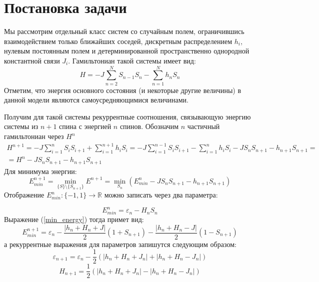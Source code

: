 
\section{Постановка задачи}
	Мы рассмотрим отдельный класс систем со случайным полем, ограничившись взаимодействием только ближайших соседей, дискретным распределением $h_i$, нулевым постоянным полем и детерминированной пространственно однородной константной связи $J_i$. Гамильтониан такой системы имеет вид:
	\begin{equation}
		H = - J \sum_{n=2}^{N} S_{n-1} S_n - \sum_{n=1}^N h_n S_n
	\end{equation}
	Отметим, что энергия основного состояния (и некоторые другие величины) в данной модели являются самоусредняющимися величинами.
	\newtheorem{ut}{Утверждение}
	\newtheorem*{zam}{Замечание}
	Получим для такой системы рекуррентные соотношения, связывающую энергию системы из $n+1$ спина с энергией $n$ спинов.  Обозначим $n$ частичный гамильтониан через $H^n$
	\begin{multline}
		H^{n+1} = - J\sum_{i=1} ^{n}  S_i S_{i+1} + \sum_{i=1}^{n+1} h_i S_i  = 
		-J \sum_{i=1}^{n-1} S_{i} S_{i+1} - \sum_{i=1}^{n} h_i S_i - J S_n S_{n+1} - h_{n+1} S_{n+1} = \\=
		H^n - J S_n S_{n+1} - h_{n+1} S_{n+1} 
	\end{multline}
	Для минимума энергии:
	\begin{equation}
	\label{min_energy}
	E_{min}^{n+1} = \min_{\{S\}\setminus \{S_{n+1}\}} E^{n+1} = \min_{S_n}(E_{min}^{n} - J S_n S_{n+1} - h_{n+1} S_{n+1})
	\end{equation}
	Отображение $E_{min}^n : \{-1, 1\}  \to \mathbb{R}$ можно записать через два параметра:
	
	\begin{equation}
	E^n_{min} = \varepsilon_n - H_n S_n
	\end{equation}
	Выражение (\ref{min_energy}) тогда примет вид:
	\begin{equation}
	E_{min}^{n+1} = \varepsilon_n - \frac {\left|h_n +H_n+J\right|} 2 (1+S_{n+1})  - \frac{\left|h_n+H_n-J\right|} 2 (1 - S_{n+1})
	\end{equation}
	а рекуррентные выражения для параметров запишутся следующим образом: 
	\begin{equation}
	\varepsilon_{n+1} = \varepsilon_n - \frac{1} 2 \left(|h_n + H_n + J_n| + |h_n+H_n - J_n| \right)
	\end{equation}
	\begin{equation}
	\label{rec}
	H_{n+1} = \frac{1}{2} \left(|h_n + H_n + J_n| - |h_n + H_n - J_n| \right)
	\end{equation}

